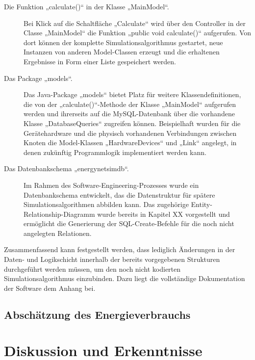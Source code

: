 \documentclass[12pt,titlepage]{article}
\begin{document}
\begin{description}
\item [Die Funktion „calculate()“ in der Klasse „MainModel“.] Bei Klick auf die Schaltfläche „Calculate“ wird über den Controller in der Classe „MainModel“ die Funktion „public void calculate()“ aufgerufen. Von dort können der komplette Simulationsalgorithmus gestartet, neue Instanzen von anderen Model-Classen erzeugt und die erhaltenen Ergebnisse in Form einer Liste gespeichert werden.
\item [Das Package „models“.] Das Java-Package „models“ bietet Platz für weitere Klassendefinitionen, die von der „calculate()“-Methode der Klasse „MainModel“ aufgerufen werden und ihrerseits auf die MySQL-Datenbank über die vorhandene Klasse „DatabaseQueries“ zugreifen können. Beispielhaft wurden für die Gerätehardware und die physisch vorhandenen Verbindungen zwischen Knoten die Model-Klassen „HardwareDevices“ und „Link“ angelegt, in denen zukünftig Programmlogik implementiert werden kann.
\item [Das Datenbankschema „energynetsimdb“.] Im Rahmen des Software-Engineering-Prozesses wurde ein Datenbankschema entwickelt, das die Datenstruktur für spätere Simulationsalgorithmen abbilden kann. Das zugehörige Entity-Relationship-Diagramm wurde bereits in Kapitel XX vorgestellt und ermöglicht die Generierung der SQL-Create-Befehle für die noch nicht angelegten Relationen.
\end{description}

Zusammenfassend kann festgestellt werden, dass lediglich Änderungen in der Daten- und Logikschicht innerhalb der bereits vorgegebenen Strukturen durchgeführt werden müssen, um den noch nicht kodierten Simulationsalgorithmus einzubinden. Dazu liegt die vollständige Dokumentation der Software dem Anhang bei.

\subsection{Abschätzung des Energieverbrauchs} \label{subsec:ErgSch}

\section{Diskussion und Erkenntnisse}
\end{document}
